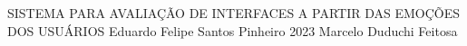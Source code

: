 \documentclass[12pt,openright]{book}
\begin{document}
%
%
%
\capa
{SISTEMA PARA AVALIAÇÃO DE INTERFACES A
PARTIR DAS EMOÇÕES DOS USUÁRIOS}
{Eduardo Felipe Santos Pinheiro}
{2023}
{Marcelo Duduchi Feitosa}

\end{document}
